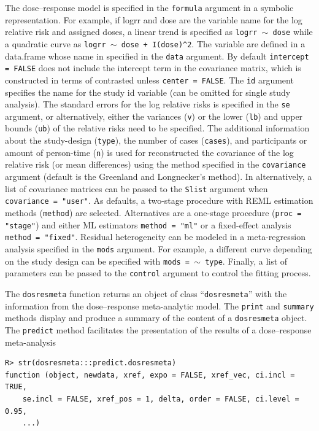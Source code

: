 \documentclass[11pt,a4paper,twoside,openany]{book}\usepackage{knitr}
\begin{document}
{The dose--response model is specified in the \texttt{formula} argument in a symbolic representation. For example, if logrr and dose are the variable name for the log relative risk and assigned doses, a linear trend is specified as \texttt{logrr $\sim$ dose} while a quadratic curve as \texttt{logrr $\sim$ dose + I(dose)\^{}2}. The variable are defined in a data.frame whose name in specified in the \texttt{data} argument. By default \texttt{intercept = FALSE} does not include the intercept term in the covariance matrix, which is constructed in terms of contrasted unless \texttt{center = FALSE}. The \texttt{id} argument specifies the name for the study id variable (can be omitted for single study analysis). 
The standard errors for the log relative risks is specified in the \texttt{se} argument, or alternatively, either the variances (\texttt{v}) or the lower (\texttt{lb}) and upper bounds (\texttt{ub}) of the relative risks need to be specified. The additional information about the study-design (\texttt{type}), the number of cases (\texttt{cases}), and participants or amount of person-time (\texttt{n}) is used for reconstructed the covariance of the log relative risk (or mean differences) using the method specified in the \texttt{covariance} argument (default is the Greenland and Longnecker’s method). In alternatively, a list of covariance matrices can be passed to the \texttt{Slist} argument when \texttt{covariance = "user"}.
As defaults, a two-stage procedure with REML estimation methods (\texttt{method}) are selected. Alternatives are a one-stage procedure (\texttt{proc = "stage"}) and either ML estimators \texttt{method = "ml"} or a fixed-effect analysis \texttt{method = "fixed"}. Residual heterogeneity can be modeled in a meta-regression analysis specified in the \texttt{mods} argument. For example, a different curve depending on the study design can be specified with \texttt{mods = $\sim$ type}. Finally, a list of parameters can be passed to the \texttt{control} argument to control the fitting process.

The \texttt{dosresmeta} function returns an object of class ``\texttt{dosresmeta}'' with the information from the dose--response meta-analytic model. The \texttt{print} and \texttt{summary} methods display and produce a summary of the content of a \texttt{dosresmeta} object. The \texttt{predict} method facilitates the presentation of the results of a dose--response meta-analysis

\begin{knitrout}\footnotesize
{}\color{fgcolor}\begin{kframe}
\begin{verbatim}
R> str(dosresmeta:::predict.dosresmeta)
function (object, newdata, xref, expo = FALSE, xref_vec, ci.incl = TRUE, 
    se.incl = FALSE, xref_pos = 1, delta, order = FALSE, ci.level = 0.95, 
    ...)  
\end{verbatim}
\end{kframe}
\end{knitrout}

}
\end{document}

